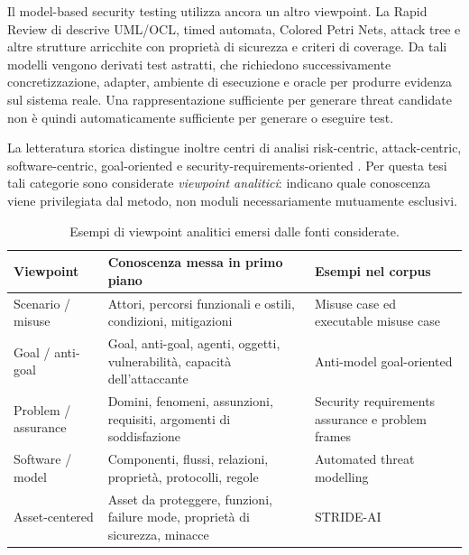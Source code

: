 \documentclass[12pt,a4paper,oneside]{report}
\begin{document}
Il model-based security testing utilizza ancora un altro viewpoint. La Rapid Review di \citet{lonetti2023mbstiot} descrive UML/OCL, timed automata, Colored Petri Nets, attack tree e altre strutture arricchite con proprietà di sicurezza e criteri di coverage. Da tali modelli vengono derivati test astratti, che richiedono successivamente concretizzazione, adapter, ambiente di esecuzione e oracle per produrre evidenza sul sistema reale. Una rappresentazione sufficiente per generare threat candidate non è quindi automaticamente sufficiente per generare o eseguire test.

La letteratura storica distingue inoltre centri di analisi risk-centric, attack-centric, software-centric, goal-oriented e security-requirements-oriented \citep{tuma2018threatanalysis}. Per questa tesi tali categorie sono considerate \emph{viewpoint analitici}: indicano quale conoscenza viene privilegiata dal metodo, non moduli necessariamente mutuamente esclusivi.

\begin{table}[htbp]
\centering
\caption{Esempi di viewpoint analitici emersi dalle fonti considerate.}
\label{tab:viewpoints}
\small
\begin{tabularx}{\textwidth}{>{\raggedright\arraybackslash}p{3.2cm} X X}
\toprule
\textbf{Viewpoint} & \textbf{Conoscenza messa in primo piano} & \textbf{Esempi nel corpus} \\
\midrule
Scenario / misuse & Attori, percorsi funzionali e ostili, condizioni, mitigazioni & Misuse case ed executable misuse case \citep{sindre2005eliciting,whittle2008executable} \\
Goal / anti-goal & Goal, anti-goal, agenti, oggetti, vulnerabilità, capacità dell'attaccante & Anti-model goal-oriented \citep{vanlamsweerde2004elaborating} \\
Problem / assurance & Domini, fenomeni, assunzioni, requisiti, argomenti di soddisfazione & Security requirements assurance e problem frames \citep{haley2008securityrequirements,hatebur2006securityengineering} \\
Software / model & Componenti, flussi, relazioni, proprietà, protocolli, regole & Automated threat modelling \citep{granata2024automatedthreatmodelling} \\
Asset-centered & Asset da proteggere, funzioni, failure mode, proprietà di sicurezza, minacce & STRIDE-AI \citep{mauri2022strideai} \\
\bottomrule
\end{tabularx}
\end{table}
\end{document}
